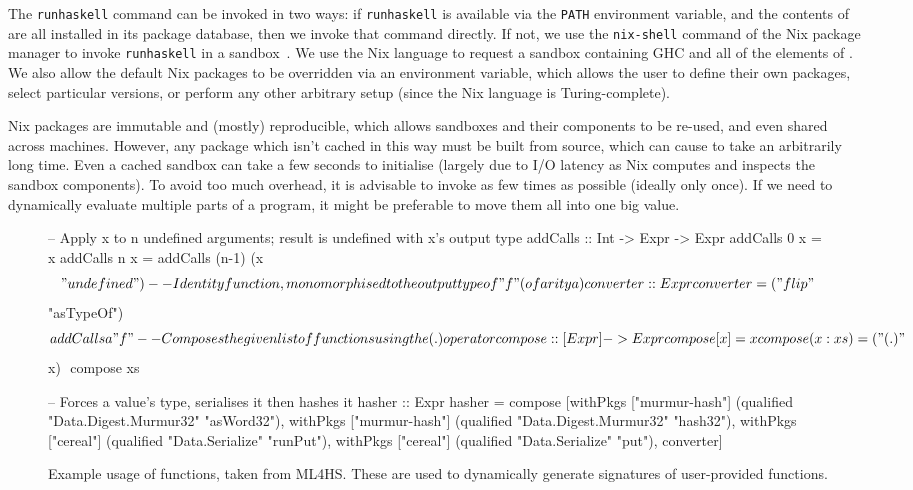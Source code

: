 The \texttt{runhaskell} command can be invoked in two ways: if
\texttt{runhaskell} is available via the \texttt{PATH} environment variable, and
the contents of  are all installed in its package database, then we
invoke that command directly. If not, we use the \texttt{nix-shell} command of
the Nix package manager to invoke \texttt{runhaskell} in a
sandbox~\cite{dolstra2004nix}. We use the Nix language to request a sandbox
containing GHC and all of the elements of . We also allow the default
Nix packages to be overridden via an environment variable, which allows the user
to define their own packages, select particular versions, or perform any other
arbitrary setup (since the Nix language is Turing-complete).

Nix packages are immutable and (mostly) reproducible, which allows sandboxes and
their components to be re-used, and even shared across machines. However, any
package which isn't cached in this way must be built from source, which can
cause  to take an arbitrarily long time. Even a cached sandbox can take
a few seconds to initialise (largely due to I/O latency as Nix computes and
inspects the sandbox components). To avoid too much overhead, it is advisable to
invoke  as few times as possible (ideally only once). If we need to
dynamically evaluate multiple parts of a program, it might be preferable to move
them all into one big  value.

\begin{figure}
  \begin{haskell}
-- Apply x to n undefined arguments; result is undefined with x's output type
addCalls :: Int -> Expr -> Expr
addCalls 0 x = x
addCalls n x = addCalls (n-1) (x $$ "undefined")

-- Identity function, monomorphised to the output type of "f" (of arity a)
converter :: Expr
converter = ("flip" $$ "asTypeOf") $$ addCalls a "f"

-- Composes the given list of functions using the (.) operator
compose :: [Expr] -> Expr
compose [x]    = x
compose (x:xs) = ("(.)" $$ x) $$ compose xs

-- Forces a value's type, serialises it then hashes it
hasher :: Expr
hasher = compose [withPkgs ["murmur-hash"]
                    (qualified "Data.Digest.Murmur32" "asWord32"),
                  withPkgs ["murmur-hash"]
                    (qualified "Data.Digest.Murmur32" "hash32"),
                  withPkgs ["cereal"]
                    (qualified "Data.Serialize" "runPut"),
                  withPkgs ["cereal"]
                    (qualified "Data.Serialize" "put"),
                  converter]
  \end{haskell}
  \caption{Example usage of \nixeval{} functions, taken from \textsc{ML4HS}.
    These are used to dynamically generate \qspec{} signatures of user-provided
    functions.}
  \label{fig:nix-eval}
\end{figure}

